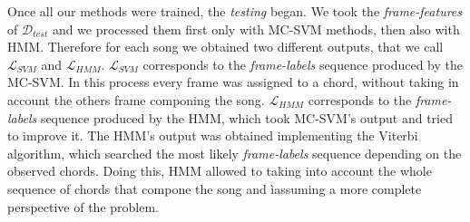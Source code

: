 %
Once all our methods were trained, the \textit{testing} began. We took the \textit{frame-features} of $\mathcal{D}_{test}$ and we processed them first only with MC-SVM methods, then also with HMM. Therefore for each song we obtained two different outputs, that we call $\mathcal{L}_{SVM}$ and $\mathcal{L}_{HMM}$. $\mathcal{L}_{SVM}$ corresponds to the \textit{frame-labels} sequence produced by the MC-SVM. In this process every frame was assigned to a chord, without taking in account the others frame componing the song.  $\mathcal{L}_{HMM}$ corresponds to the \textit{frame-labels} sequence produced by the HMM, which took MC-SVM's output and tried to improve it. The HMM's output was obtained implementing the Viterbi algorithm, which searched the most likely \textit{frame-labels} sequence depending on the observed chords. Doing this, HMM allowed to taking into account the whole sequence of chords that compone the song and ìassuming a more complete perspective of the problem.
